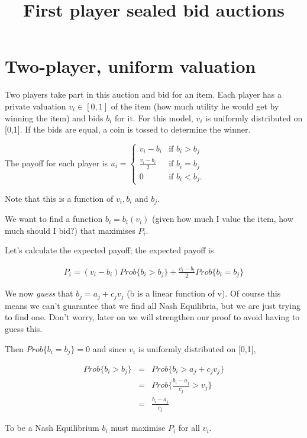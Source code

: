 \documentclass{article}
\title{First player sealed bid auctions}
\date{}
\begin{document}
\maketitle

\section{Two-player, uniform valuation}

Two players take part in this auction and bid for an item. Each player has a private valuation $v_i \in [0,1]$ of the item (how much utility he would get by winning the item) and bids $b_i$ for it. For this model, $v_i$ is uniformly distributed on [0,1]. If the bids are equal, a coin is tossed to determine the winner.

The payoff for each player is 
$
u_i = \begin{cases} v_i - b_i &\mbox{if } b_i > b_j \\
\frac{v_i - b_i}{2} &\mbox{if } b_i = b_j \\
0 &\mbox{if } b_i < b_j. \end{cases}
$

Note that this is a function of $v_i, b_i$ and $b_j$.

We want to find a function $b_i = b_i(v_i)$ (given how much I value the item, how much should I bid?) that maximises $P_i$.

Let's calculate the expected payoff; the expected payoff is 

\begin{eqnarray*}
P_i = (v_i - b_i) Prob\{b_i > b_j\} + \frac{v_i - b_i}{2} Prob\{b_i = b_j\}
\end{eqnarray*}

We now \emph{guess} that $b_j = a_j + c_j v_j$ (b is a linear function of v). Of course this means we can't guarantee that we find all Nash Equilibria, but we are just trying to find one. Don't worry, later on we will strengthen our proof to avoid having to guess this.

Then $Prob\{b_i = b_j\} = 0$ and since $v_i$ is uniformly distributed on [0,1],

\begin{eqnarray*}
Prob\{b_i > b_j\} &=& Prob\{b_i > a_j + c_j v_j\} \\
&=& Prob\{\frac{b_i - a_j}{c_j} > v_j\} \\
&=& \frac{b_i - a_j}{c_j}
\end{eqnarray*}

To be a Nash Equilibrium $b_i$ must maximise $P_i$ for all $v_i$.
\end{document}
